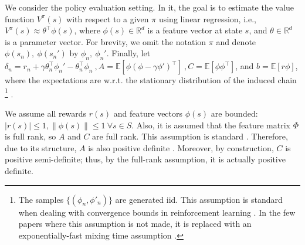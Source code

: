 \documentclass[usenames,dvipsnames,final,12pt]{colt2018} %
\newcommand{\bE}{\mathbb{E}}
\begin{document}
{We consider the policy evaluation setting. In it, the goal is to estimate the value function $V^\pi(s)$ with respect to a given $\pi$ using linear regression, i.e., $V^\pi(s)\approx\theta^\top\phi(s)$, where $\phi(s) \in \mathbb{R}^d$ is a feature vector at state $s$, and $\theta \in \mathbb{R}^d$ is a parameter vector. For brevity, we omit the notation $\pi$ and denote $\phi(s_n),~\phi(s_n')$  by $\phi_n,~\phi_n'$. Finally, let $\delta_n = r_n +\gamma\theta_n^\top\phi_n' - \theta_n^\top\phi_n~,A = \bE[\phi(\phi-\gamma\phi')^\top]~,C=\bE[\phi\phi^\top]$, and $b=\bE[r\phi]$, where the expectations are w.r.t. the stationary distribution of the induced chain \footnote{The samples $\{(\phi_n,\phi'_n)\}$ are generated iid. This assumption is standard when dealing with convergence bounds in reinforcement learning \citep{liu2015finite,sutton2009convergent,sutton2009fast}.  In the few papers where this assumption is not made, it is replaced with an exponentially-fast mixing time assumption \citep{korda2015td,tsitsiklis1997analysis}.}%
}.


We assume all rewards $r(s)$ and feature vectors $\phi(s)$ are bounded:
\(
|r(s)| \leq 1 ,	\|\phi(s)\| \leq 1 ~ \forall s \in S.
\)
Also, it is assumed that the feature matrix $\Phi$ is full rank, so $A$ and $C$ are full rank. This assumption is standard \citep{maei2010toward,sutton2009convergent}. Therefore, due to its structure, $A$ is also positive definite \citep{bertsekas2012dynamic}. Moreover, by construction, $C$ is positive semi-definite; thus, by the full-rank assumption, it is actually positive definite.
\end{document}
